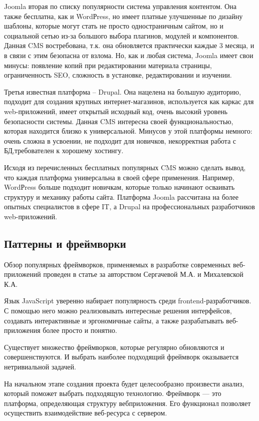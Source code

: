 Joomla вторая по списку популярности система управления контентом.
Она также бесплатна, как и WordРress, но имеет платные улучшенные по дизайну шаблоны, которые могут стать не просто одностраничным сайтом, но и социальной сетью из-за большого выбора плагинов, модулей и компонентов.
Данная CMS востребована, т.к. она обновляется практически каждые 3 месяца, и в связи с этим безопасна от взлома.
Но, как и любая система, Joomla имеет свои минусы: появление копий при редактировании материала страницы, ограниченность SEO, сложность в установке, редактировании и изучении.

Третья известная платформа – Drupal.
Она нацелена на большую аудиторию, подходит для создания крупных интернет-магазинов, используется как каркас для web-приложений, имеет открытый исходный код, очень высокий уровень безопасности системы.
Данная CMS интересна своей функциональностью, которая находится близко к универсальной.
Минусов у этой платформы немного: очень сложна в усвоении, не подходит для новичков, некорректная работа с БД,требователен к хорошему хостингу.

Исходя из перечисленных бесплатных популярных CMS можно сделать вывод, что каждая платформа универсальна в своей сфере применения.
Например, WordРress больше подходит новичкам, которые только начинают осваивать структуру и механику работы сайта.
Платформа Joomla рассчитана на более опытных специалистов в сфере IT, а Drupal на профессиональных разработчиков web-приложений. 

\subsection{Паттерны и фреймворки}

Обзор популярных фреймворков, применяемых в разработке современных веб-приложений проведен в статье \cite{sergacheva-framework} за авторством Сергачевой М.А. и Михалевской К.А.

Язык JavaScript уверенно набирает популярность среди frontend-разработчиков.
С помощью него можно реализовывать интересные решения интерфейсов, создавать интерактивные и эргономичные сайты, а также разрабатывать веб-приложения более просто и понятно.

Существует множество фреймворков, которые регулярно обновляются и совершенствуются.
И выбрать наиболее подходящий фреймворк оказывается нетривиальной задачей.

На начальном этапе создания проекта будет целесообразно произвести анализ, который поможет
выбрать подходящую технологию.
Фреймворк — это платформа, определяющая структуру вебприложения.
Его функционал позволяет осуществить взаимодействие веб-ресурса с сервером.

